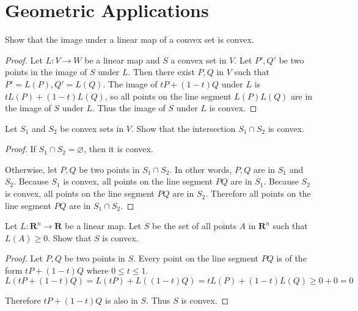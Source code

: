 \section{Geometric Applications}
\setcounter{exercise}{0}

\begin{exercise}
    Show that the image under a linear map of a convex set is convex.
\end{exercise}

\begin{proof}
    Let $L: V\to W$ be a linear map and $S$ a convex set in $V$. Let $P', Q'$ be two points in the image of $S$ under $L$. Then there exist $P, Q$ in $V$ such that $P' = L(P), Q' = L(Q)$. The image of $tP + (1-t)Q$ under $L$ is $tL(P) + (1-t)L(Q)$, so all points on the line segment $L(P)L(Q)$ are in the image of $S$ under $L$. Thus the image of $S$ under $L$ is convex.
\end{proof}

\begin{exercise}
    Let $S_{1}$ and $S_{2}$ be convex sets in $V$. Show that the intersection $S_{1}\cap S_{2}$ is convex.
\end{exercise}

\begin{proof}
    If $S_{1}\cap S_{2} = \varnothing$, then it is convex.

    Otherwise, let $P, Q$ be two points in $S_{1}\cap S_{2}$. In other words, $P, Q$ are in $S_{1}$ and $S_{2}$. Because $S_{1}$ is convex, all points on the line segment $PQ$ are in $S_{1}$. Because $S_{2}$ is convex, all points on the line segment $PQ$ are in $S_{2}$. Therefore all points on the line segment $PQ$ are in $S_{1}\cap S_{2}$.
\end{proof}

\begin{exercise}
    Let $L: \mathbf{R}^{n}\to \mathbf{R}$ be a linear map. Let $S$ be the set of all points $A$ in $\mathbf{R}^{n}$ such that $L(A)\geq 0$. Show that $S$ is convex.
\end{exercise}

\begin{proof}
    Let $P, Q$ be two points in $S$. Every point on the line segment $PQ$ is of the form $tP + (1 - t)Q$ where $0\leq t \leq 1$.
    \[
        L(tP + (1-t)Q) = L(tP) + L((1-t)Q) = tL(P) + (1-t)L(Q) \geq 0 + 0 = 0
    \]

    Therefore $tP + (1-t)Q$ is also in $S$. Thus $S$ is convex.
\end{proof}

